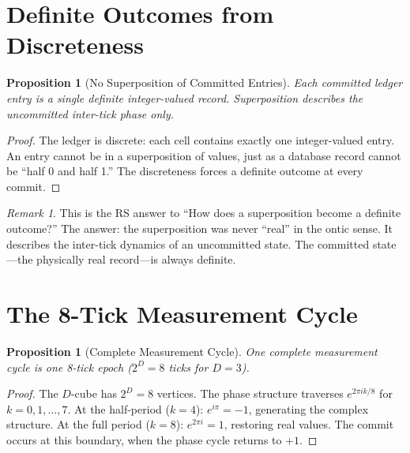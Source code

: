 \documentclass[12pt,a4paper]{article}
\newtheorem{proposition}[theorem]{Proposition}
\theoremstyle{definition}
\theoremstyle{remark}
\newtheorem{remark}[theorem]{Remark}
\begin{document}
\section{Definite Outcomes from Discreteness}
\label{sec:discrete}

\begin{proposition}[No Superposition of Committed Entries]
\label{prop:nosuperposition}
Each committed ledger entry is a single definite integer-valued record.
Superposition describes the uncommitted inter-tick phase only.
\end{proposition}

\begin{proof}
The ledger is discrete: each cell contains exactly one
integer-valued entry.  An entry cannot be in a superposition of
values, just as a database record cannot be ``half 0 and half 1.''
The discreteness forces a definite outcome at every commit.
\end{proof}

\begin{remark}
This is the RS answer to ``How does a superposition become a
definite outcome?''  The answer: the superposition was never
``real'' in the ontic sense.  It describes the inter-tick dynamics
of an uncommitted state.  The committed state---the physically
real record---is always definite.
\end{remark}

\section{The 8-Tick Measurement Cycle}
\label{sec:8tick}

\begin{proposition}[Complete Measurement Cycle]
\label{prop:8tick}
One complete measurement cycle is one 8-tick epoch
($2^D = 8$ ticks for $D = 3$).
\end{proposition}

\begin{proof}
The $D$-cube has $2^D = 8$ vertices.  The phase structure
traverses $e^{2\pi i k/8}$ for $k = 0, 1, \ldots, 7$.  At the
half-period ($k = 4$): $e^{i\pi} = -1$, generating the complex
structure.  At the full period ($k = 8$): $e^{2\pi i} = 1$,
restoring real values.  The commit occurs at this boundary, when
the phase cycle returns to $+1$.
\end{proof}
\end{document}
